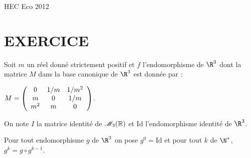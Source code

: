 \documentclass[11pt]{article}%
\begin{document}
\begin{center}
{\huge HEC Eco 2012}
\end{center}

\section*{EXERCICE}

\begin{flushleft}
Soit $m$ un réel donné strictement positif et $f$ l'endomorphisme de
$\R^{3}$ dont la matrice $M$ dans la base canonique de $\R^{3}$ est
donnée par :\\


\end{flushleft}

\noindent

\begin{flushleft}
$M = \left(
\begin{array}
[c]{ccc}0 & 1/m & 1/m^{2}\\
m & 0 & 1/m\\
m^{2} & m & 0
\end{array}
\right) $.


\end{flushleft}

\noindent

\begin{flushleft}
On note $I$ la matrice identité de $\mathscr{M}_{3}(\mathbb{R}) $ et $\text{Id}$
l'endomorphisme identité de $\R^{3}$.


\end{flushleft}

\noindent

\begin{flushleft}
Pour tout endomorphisme $g$ de $\R^{3}$ on pose $g^{0} = \text{Id}$ et
pour tout $k$ de $\N^{*}$, $g^{k} = g\circ g^{k-1}$.


\end{flushleft}
\end{document}
